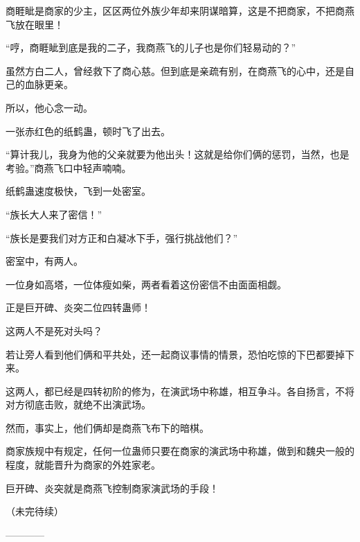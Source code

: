 \begin{this_body}
商睚眦是商家的少主，区区两位外族少年却来阴谋暗算，这是不把商家，不把商燕飞放在眼里！

“哼，商睚眦到底是我的二子，我商燕飞的儿子也是你们轻易动的？”

虽然方白二人，曾经救下了商心慈。但到底是亲疏有别，在商燕飞的心中，还是自己的血脉更亲。

所以，他心念一动。

一张赤红色的纸鹤蛊，顿时飞了出去。

“算计我儿，我身为他的父亲就要为他出头！这就是给你们俩的惩罚，当然，也是考验。”商燕飞口中轻声喃喃。

纸鹤蛊速度极快，飞到一处密室。

“族长大人来了密信！”

“族长是要我们对方正和白凝冰下手，强行挑战他们？”

密室中，有两人。

一位身如高塔，一位体瘦如柴，两者看着这份密信不由面面相觑。

正是巨开碑、炎突二位四转蛊师！

这两人不是死对头吗？

若让旁人看到他们俩和平共处，还一起商议事情的情景，恐怕吃惊的下巴都要掉下来。

这两人，都已经是四转初阶的修为，在演武场中称雄，相互争斗。各自扬言，不将对方彻底击败，就绝不出演武场。

然而，事实上，他们俩却是商燕飞布下的暗棋。

商家族规中有规定，任何一位蛊师只要在商家的演武场中称雄，做到和魏央一般的程度，就能晋升为商家的外姓家老。

巨开碑、炎突就是商燕飞控制商家演武场的手段！

（未完待续）

------------

\end{this_body}

